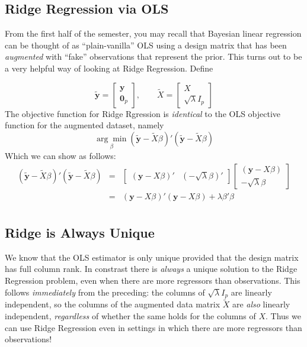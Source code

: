 \subsection{Ridge Regression via OLS}
From the first half of the semester, you may recall that Bayesian linear regression can be thought of as ``plain-vanilla'' OLS using a design matrix that has been \emph{augmented} with ``fake'' observations that represent the prior. This turns out to be a very helpful way of looking at Ridge Regression. Define

$$\widetilde{\textbf{y}} = \left[ \begin{array}
	{c} \textbf{y} \\ \textbf{0}_p
\end{array}\right], \quad \quad \widetilde{X} = \left[ \begin{array}
	{c} X \\ \sqrt{\lambda} I_p
\end{array}\right]$$
The objective function for Ridge Rgression is \emph{identical} to the OLS objective function for the augmented dataset, namely
	$$\underset{\beta}{\arg \min} \left(\widetilde{\mathbf{y}} - \widetilde{X}\beta\right)'\left(\widetilde{\mathbf{y}} - \widetilde{X}\beta\right)$$
Which we can show as follows:
\begin{eqnarray*}
	\left(\widetilde{\mathbf{y}} - \widetilde{X}\beta\right)'\left(\widetilde{\mathbf{y}} - \widetilde{X}\beta\right) &=& \left[\begin{array}
		{cc} (\mathbf{y} - X\beta)' & (-\sqrt{\lambda}\beta)'
	\end{array} \right] \left[\begin{array}
		{c} (\mathbf{y} - X\beta) \\ -\sqrt{\lambda} \beta
	\end{array} \right]\\
		&=& (\mathbf{y} - X\beta)' (\mathbf{y} - X\beta) + \lambda \beta'\beta\\
\end{eqnarray*}

\subsection{Ridge is Always Unique} We know that the OLS estimator is only unique provided that the design matrix has full column rank. In constrast there is \emph{always} a unique solution to the Ridge Regression problem, even when there are more regressors than observations. This follows \emph{immediately} from the preceding: the columns of $\sqrt{\lambda}I_p$ are linearly independent, so the columns of the augmented data matrix $\widetilde{X}$ are \emph{also} linearly independent, \emph{regardless} of whether the same holds for the columns of $X$. Thus we can use Ridge Regression even in settings in which there are more regressors than observations!

